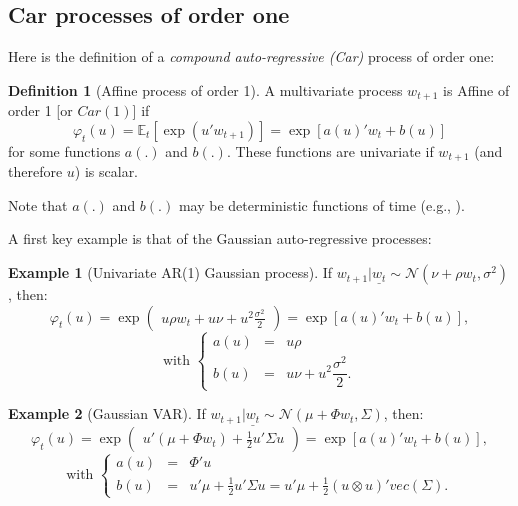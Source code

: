 \documentclass[
  12pt,
]{book}
\theoremstyle{definition}
\newtheorem{definition}{Definition}[chapter]
\theoremstyle{definition}
\newtheorem{example}{Example}[chapter]
\theoremstyle{definition}
\theoremstyle{definition}
\theoremstyle{remark}
\begin{document}
\hypertarget{car-processes-of-order-one}{%
\subsection{Car processes of order one}\label{car-processes-of-order-one}}

Here is the definition of a \emph{compound auto-regressive (Car)} process of order one:

\begin{definition}[Affine process of order 1]
\protect\hypertarget{def:Car1}{}\label{def:Car1}A multivariate process \(w_{t+1}\) is Affine of order 1 {[}or \(Car(1)\){]} if
\[
\varphi_t(u)=\mathbb{E}_t[\exp(u'w_{t+1})]=\exp[a(u)'w_t+b(u)]
\]
for some functions \(a(.)\) and \(b(.)\). These functions are univariate if \(w_{t+1}\) (and therefore \(u\)) is scalar.
\end{definition}

Note that \(a(.)\) and \(b(.)\) may be deterministic functions of time (e.g., \citet{Chikhani_Renne_2022}).

A first key example is that of the Gaussian auto-regressive processes:

\begin{example}[Univariate AR(1) Gaussian process]
\protect\hypertarget{exm:GAR1}{}\label{exm:GAR1}If \(w_{t+1}|\underline{w_t} \sim \mathcal{N}(\nu+\rho w_t, \sigma^2)\), then:
\[
\varphi_t(u) = \exp\left(
\begin{array}{l}
u \rho w_t + u \nu + u^2  \frac{\sigma^2}{2}
\end{array}
\right) = \exp[a(u)'w_t+b(u)],
\]
\[
\mbox{with }\left\{
\begin{array}{ccc}
a(u) &=& u \rho\\
b(u) &=& u \nu + u^2  \dfrac{\sigma^2}{2}.
\end{array}
\right.
\]
\end{example}

\begin{example}[Gaussian VAR]
\protect\hypertarget{exm:GVAR1}{}\label{exm:GVAR1}If \(w_{t+1}|\underline{w_t} \sim \mathcal{N}(\mu+\Phi w_t, \Sigma)\), then:
\[
\varphi_t(u) = \exp\left(
\begin{array}{l}
u' (\mu + \Phi  w_t)  +  \frac{1}{2} u' \Sigma u
\end{array}
\right) = \exp[a(u)'w_t+b(u)],
\]
\[
\mbox{with }\left\{
\begin{array}{ccl}
a(u) &=& \Phi'u\\
b(u) &=& u' \mu +  \frac{1}{2} u' \Sigma u = u' \mu + \frac{1}{2}(u \otimes u)' vec(\Sigma).
\end{array}
\right.
\]
\end{example}
\end{document}
